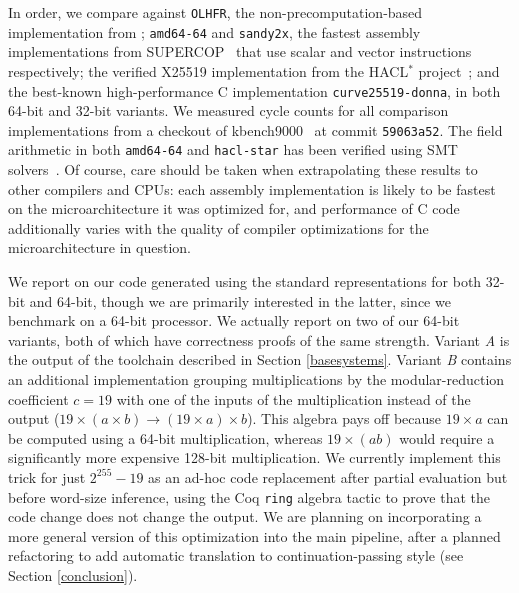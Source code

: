 \documentclass[conference,letterpaper]{IEEEtran}
\begin{document}
In order, we compare against \texttt{OLHFR}, the non-precomputation-based implementation from \cite{oliveira_sac2017}; \texttt{amd64-64} and \texttt{sandy2x}, the fastest assembly implementations from SUPERCOP~\cite{SUPERCOP} that use scalar and vector instructions respectively; the verified X25519 implementation from the HACL$^*$ project~\cite{hacl}; and the best-known high-performance C implementation \texttt{curve25519-donna}, in both 64-bit and 32-bit variants.
We measured cycle counts for all comparison implementations from a checkout of kbench9000~\cite{kbench} at commit \texttt{59063a52}.
The field arithmetic in both \texttt{amd64-64} and \texttt{hacl-star} has been verified using SMT solvers~\cite{verif25519,ECCstar}.
Of course, care should be taken when extrapolating these results to other compilers and CPUs: each assembly implementation is likely to be fastest on the microarchitecture it was optimized for, and performance of C code additionally varies with the quality of compiler optimizations for the microarchitecture in question.

We report on our code generated using the standard representations for both 32-bit and 64-bit, though we are primarily interested in the latter, since we benchmark on a 64-bit processor.
We actually report on two of our 64-bit variants, both of which have correctness proofs of the same strength.
Variant \emph{A} is the output of the toolchain described in Section \ref{basesystems}.
Variant \emph{B} contains an additional implementation grouping multiplications by the modular-reduction coefficient $c=19$ with one of the inputs of the multiplication instead of the output ($19\times (a\times b) \longrightarrow (19\times a)\times b$).
This algebra pays off because $19\times a$ can be computed using a 64-bit multiplication, whereas $19\times (ab)$ would require a significantly more expensive 128-bit multiplication.
We currently implement this trick for just $2^{255}-19$ as an ad-hoc code replacement after partial evaluation but before word-size inference, using the Coq \texttt{ring} algebra tactic to prove that the code change does not change the output.
We are planning on incorporating a more general version of this optimization into the main pipeline, after a planned refactoring to add automatic translation to continuation-passing style (see Section \ref{conclusion}).
\end{document}
